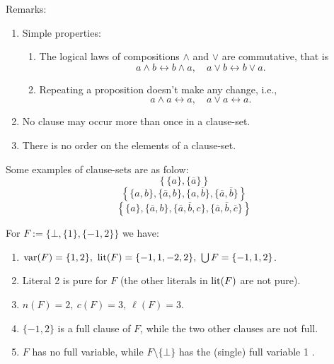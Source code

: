\documentclass[12pt]{book}
\begin{document}
Remarks:
\begin{enumerate}
      \item Simple properties:
      \begin{enumerate}
            \item The logical laws of compositions $\wedge$ and $\vee$ are commutative, that is
            $$a\wedge b \leftrightarrow b\wedge a, \quad  a\vee b \leftrightarrow b\vee a.$$
            \item Repeating a proposition doesn't make any change, i.e.,
            $$a\wedge a \leftrightarrow a, \quad  a\vee a \leftrightarrow a.$$
      \end{enumerate}
      \item No clause may occur more than once in a clause-set.
      \item There is no order on the elements of a clause-set.
\end{enumerate}
\begin{examp}\label{exp:cls}
      Some examples of clause-sets are as folow:
      $$\left\{\{a\}, \{\overline{a}\}\right\}$$
      $$\left\{\{a,b\}, \{\overline{a},b\}, \{a, \overline{b}\}, \{\overline{a},\overline{b}\}\right\}$$
      $$\left\{\{a\}, \{\overline{a},b\}, \{\overline{a}, \overline{b}, c\}, \{\overline{a}, \overline{b}, \overline{c}\}\right\}$$
\end{examp}
\begin{examp}\label{exp:cls}
      For $F := \{\bot, \{1\}, \{−1, 2\}\}$ we have:
	  \begin{enumerate}
	        \item $\operatorname{var}(F) = \{1, 2\},\ \operatorname{lit}(F) = \{- 1, 1,- 2, 2\},\ \bigcup F = \{-1, 1, 2\}$.
			\item Literal 2 is pure for $F$ (the other literals in $\operatorname{lit}(F)$ are not pure).
			\item $n(F) = 2,\ c(F) = 3,\ \ell(F) = 3$.
			\item $\{-1, 2\}$ is a full clause of $F$, while the two other clauses are not full.
			\item $F$ has no full variable, while $F \setminus \{ \bot\}$ has the (single) full variable 1  \cite{h9}.
	  \end{enumerate}
\end{examp}
\end{document}

